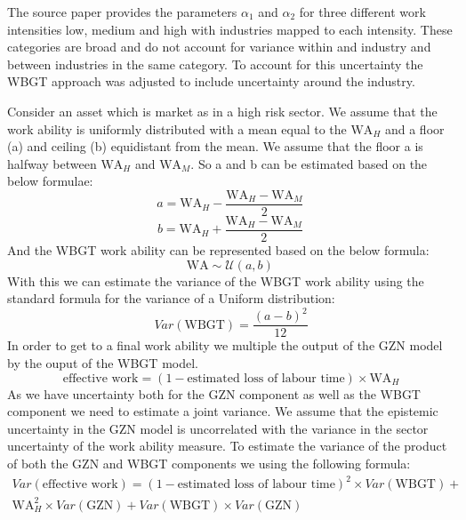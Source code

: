 \documentclass[a4paper,11pt]{extarticle} %
\theoremstyle{definition}
\begin{document}
The source paper provides the parameters $\alpha_1$ and $\alpha_2$ for three different work intensities low, medium and high with industries mapped to each intensity. These categories are broad and do not account for variance within and industry and between industries in the same category. To account for this uncertainty the WBGT approach was adjusted to include uncertainty around the industry.

Consider an asset which is market as in a high risk sector. We assume that the work ability is uniformly distributed with a mean equal to the $\text{WA}_H$ and a floor (a) and ceiling (b) equidistant from the mean. We assume that the floor a is halfway between $\text{WA}_H$ and $\text{WA}_M$. So a and b can be estimated based on the below formulae:
\begin{equation}
    \label{Eq:WBGT_Floor}
     a = \text{WA}_H - \frac{\text{WA}_H - \text{WA}_M}{2}\,
\end{equation}
\begin{equation}
    \label{Eq:WBGT_Ceil}
     b = \text{WA}_H + \frac{\text{WA}_H - \text{WA}_M}{2}\,
\end{equation}
And the WBGT work ability can be represented based on the below formula:
\begin{equation}
    \label{Eq:WBGT_Uniform}
     \text{WA} \sim \mathcal{U}(a ,b)\,
\end{equation}
With this we can estimate the variance of the WBGT work ability using the standard formula for the variance of a Uniform distribution:
\begin{equation}
    \label{Eq:WBGT_Variance}
     Var\left(\text{WBGT}\right) = \frac{(a-b)^2}{ 12}
\end{equation}
In order to get to a final work ability we multiple the output of the GZN model by the ouput of the WBGT model.
\begin{equation}
    \label{Eq:Final_Mean_WA}
     \text{effective work} = \left(1- \text{estimated loss of labour time}\right) \times \text{WA}_H
\end{equation}
As we have uncertainty both for the GZN component as well as the WBGT component we need to estimate a joint variance. We assume that the epistemic uncertainty in the GZN model is uncorrelated with the variance in the sector uncertainty of the work ability measure. To estimate the variance of the product of both the GZN and WBGT components we using the following formula:
\begin{equation}
\begin{aligned}
    \label{Eq:Var_Joint}
     Var\left(\text{effective work}\right) = \left(1- \text{estimated loss of labour time}\right)^2 \times Var\left(\text{WBGT}\right) + \\
      \text{WA}_H^2 \times Var\left(\text{GZN}\right) +  Var\left(\text{WBGT}\right) \times Var\left(\text{GZN}\right)
      \end{aligned}
\end{equation}
\end{document}
